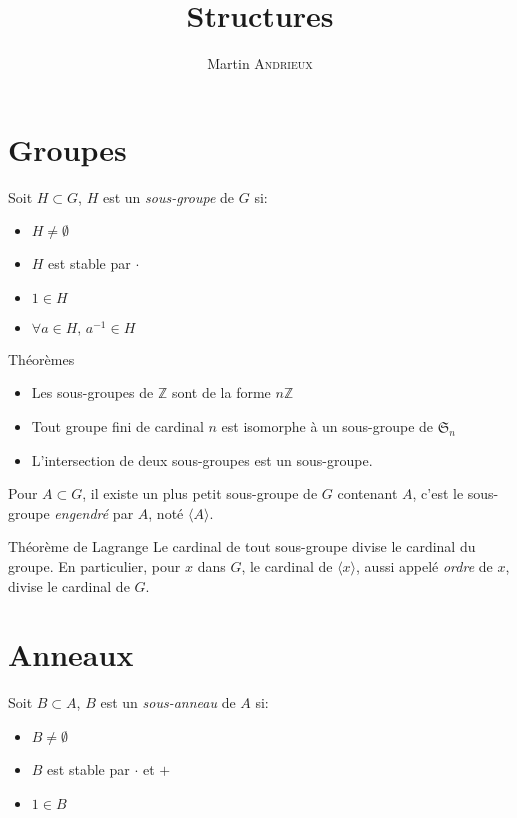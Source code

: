 \documentclass[french, a4paper, 11pt, twocolumn]{article}
\title{Structures}
\author{Martin \textsc{Andrieux}}
\date{}
\newcommand{\Z}{\mathbb{Z}}   %
\begin{document}
\maketitle

\section{Groupes}
\begin{definition}
  Soit $H\subset G$, $H$ est un \emph{sous-groupe} de $G$ si:
  \begin{itemize}[label=$\bullet$]
    \item $H\neq\emptyset$
    \item $H$ est stable par $\cdot$
    \item $1\in H$
    \item $\forall a \in H,\, a^{-1}\in H$
  \end{itemize}
\end{definition}

\begin{theoreme}{Théorèmes}
  \begin{itemize}[label=$\bullet$]
    \item Les sous-groupes de $\Z$ sont de la forme $n\Z$
    \item Tout groupe fini de cardinal $n$ est isomorphe à un sous-groupe de $\mathfrak S_{n}$
    \item L'intersection de deux sous-groupes est un sous-groupe.
  \end{itemize}
\end{theoreme}

\begin{definition}
  Pour $A\subset G$, il existe un plus petit sous-groupe de $G$ contenant $A$, c'est le sous-groupe \emph{engendré} par $A$, noté $\langle A\rangle$.
\end{definition}

\begin{theoreme}{Théorème de Lagrange}
  Le cardinal de tout sous-groupe divise le cardinal du groupe.
  \tcblower
  En particulier, pour $x$ dans $G$, le cardinal de $\langle x \rangle$, aussi appelé \emph{ordre} de $x$, divise le cardinal de $G$.
\end{theoreme}

\section{Anneaux}
\begin{definition}
  Soit $B\subset A$, $B$ est un \emph{sous-anneau} de $A$ si:
  \begin{itemize}[label=$\bullet$]
    \item $B\neq\emptyset$
    \item $B$ est stable par $\cdot$ et $+$
    \item $1\in B$
  \end{itemize}
\end{definition}
\end{document}
